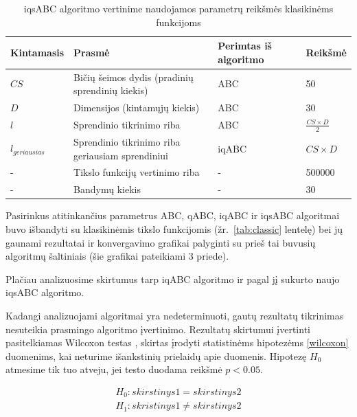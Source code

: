 \documentclass{VUMIFPSmagistrinis}
\begin{document}
\begin{table}[H]
\centering
\caption{iqsABC algoritmo vertinime naudojamos parametrų reikšmės klasikinėms funkcijoms}
\label{tab:par}
\begin{tabular}{llXl}
Kintamasis&Prasmė&Perimtas iš algoritmo&Reikšmė \\
\hline
$CS$ & Bičių šeimos dydis (pradinių sprendinių kiekis) & ABC & 50 \\ \hline
$D$& Dimensijos (kintamųjų kiekis) & ABC & $30$ \\ \hline
$l$ & Sprendinio tikrinimo riba & ABC & $\frac{CS\times D}{2}$ \\ \hline
$l_{geriausias}$ & Sprendinio tikrinimo riba geriausiam sprendiniui & iqABC & $CS \times D$\\ \hline
-& Tikslo funkcijų vertinimo riba & - & 500000\\ \hline
-& Bandymų kiekis & - & $30$

\end{tabular}
\end{table}

Pasirinkus atitinkančius parametrus ABC, qABC, iqABC ir iqsABC algoritmai buvo išbandyti su klasikinėmis tikslo funkcijomis (žr.~\ref{tab:classic} lentelę)  bei jų gaunami rezultatai ir konvergavimo grafikai palyginti su prieš tai buvusių algoritmų šaltiniais (šie grafikai pateikiami 3 priede).

Plačiau analizuosime skirtumus tarp iqABC algoritmo ir pagal jį sukurto naujo iqsABC algoritmo.



Kadangi analizuojami algoritmai yra nedeterminuoti, gautų rezultatų tikrinimas nesuteikia prasmingo algoritmo įvertinimo. Rezultatų skirtumui įvertinti pasitelkiamas Wilcoxon testas \cite{Wil45}, skirtas įrodyti statistinėms hipotezėms \eqref{wilcoxon} duomenims, kai neturime išankstinių prielaidų apie duomenis. Hipotezę $H_{0}$ atmesime tik tuo atveju, jei testo duodama reikšmė $p<0.05$. %



\begin{equation}\label{wilcoxon}
\begin{matrix}
H_{0}: skirstinys1 = skirstinys2 \\
H_{1}: skristinys1 \neq skirstinys2
\end{matrix}
\end{equation}
\end{document}

